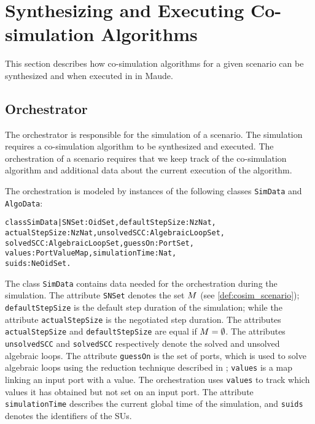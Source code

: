 \section{Synthesizing and Executing Co-simulation Algorithms}\label{sc:synthesize}
This section describes how co-simulation algorithms for a given scenario can be synthesized and when executed in in Maude.

\subsection{Orchestrator}
The orchestrator is responsible for the simulation of a scenario.
The simulation requires a co-simulation algorithm to be synthesized and executed.
The orchestration of a scenario requires that we keep track of the co-simulation algorithm and additional data about the current execution of the algorithm.

The orchestration is modeled by instances of the following classes \texttt{SimData} and \texttt{AlgoData}:

\small
\begin{alltt}
class SimData | SNSet : OidSet,           defaultStepSize : NzNat,
          actualStepSize : NzNat,         unsolvedSCC : AlgebraicLoopSet, 
          solvedSCC : AlgebraicLoopSet,   guessOn : PortSet,
          values : PortValueMap,          simulationTime : Nat,
          suids : NeOidSet .
\end{alltt}
\normalsize

The class \texttt{SimData} contains data needed for the orchestration during the simulation.
The attribute \texttt{SNSet} denotes the set $M$ (see \cref{def:cosim_scenario}); \texttt{defaultStepSize} is the default step duration of the simulation; while the attribute \texttt{actualStepSize} is the negotiated step duration.
The attributes \texttt{actualStepSize} and \texttt{defaultStepSize} are equal if $M = \emptyset$.
The attributes \texttt{unsolvedSCC} and \texttt{solvedSCC} respectively denote the solved and unsolved algebraic loops.
The attribute \texttt{guessOn} is the set of ports, which is used to solve algebraic loops using the reduction technique described in \cite{thrane2021}; \texttt{values} is a map linking an input port with a value. 
The orchestration uses \texttt{values} to track which values it has obtained but not set on an input port. 
The attribute \texttt{simulationTime} describes the current global time of the simulation, and \texttt{suids} denotes the identifiers of the SUs.


